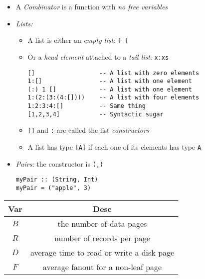 \documentclass[landscape,8pt]{extarticle}
\newcommand{\code}{\lstinline}
\begin{document}
\begin{multicols}{4}
\begin{itemize}
\begin{itemize}
           \end{itemize}
           \item A \emph{Combinator} is a function with \emph{no free variables}
           \item \emph{Lists:}
           \begin{itemize}
               \item A list is either an \emph{empty list}: \code{[ ]}
               \item Or a \emph{head element} attached to a \emph{tail list}: \code{x:xs}
               \begin{lstlisting}
[]                  -- A list with zero elements
1:[]                -- A list with one element
(:) 1 []            -- A list with one element
1:(2:(3:(4:[])))    -- A list with four elements
1:2:3:4:[]          -- Same thing
[1,2,3,4]           -- Syntactic sugar
               \end{lstlisting}
               \item \code{[]} and \code{:} are called the list \emph{constructors}
               \item A list has type \code{[A]} if each one of its elements has type \code{A}
            \end{itemize}
               \item \emph{Pairs:} the constructor is \code{(,)}
               \begin{lstlisting}
myPair :: (String, Int)
myPair = ("apple", 3)
               \end{lstlisting}
           \end{itemize}
    \begin{center}
        \begin{tabular}{ | c | c | } \toprule
            Var     & Desc                                      \\ \midrule
            $B$     & the number of data pages                  \\ \midrule
            $R$     & number of records per page                \\ \midrule
            $D$     & average time to read or write a disk page \\ \midrule
            $F$     & average fanout for a non-leaf page        \\ \bottomrule
        \end{tabular}
    \end{center}
    \begin{center}
        \begin{adjustbox}{angle=270}

\end{adjustbox}
\end{center}
\end{multicols}
\end{document}
